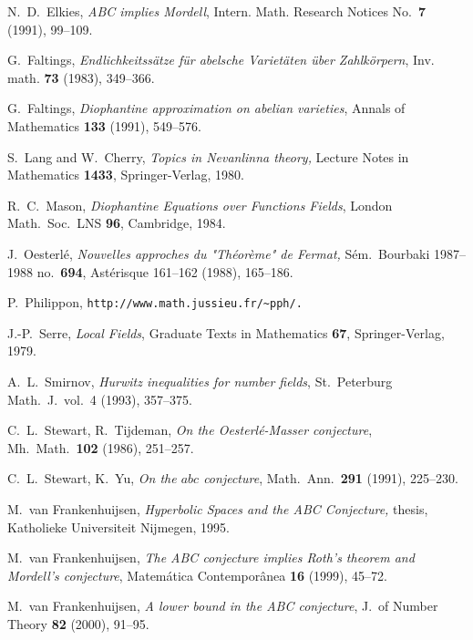 \documentclass{amsart}
\theoremstyle{definition}\newtheorem{definition}[theorem]{Definition}
\theoremstyle{remark}\newtheorem{remark}[theorem]{Remark}
\numberwithin{equation}{section}
\begin{document}

\begin{thebibliography}{M}

	N.\ D.\ Elkies,
\textit{ABC implies Mordell},
Intern. Math. Research Notices No.~\textbf{7} (1991), 99--109.

	G.\ Faltings,
\textit{Endlichkeitss\"atze f\"ur abelsche Variet\"aten \"uber Zahlk\"orpern},
Inv. math. \textbf{73} (1983), 349--366.

	G.\ Faltings,
\textit{Diophantine approximation on abelian varieties},
Annals of Mathematics \textbf{133} (1991), 549--576.

	S.\ Lang and W.\ Cherry,
\textit{Topics in Nevanlinna theory,}
Lecture Notes in Mathematics \textbf{1433}, Springer-Verlag, 1980.

	R.\ C.\ Mason,
\textit{Diophantine Equations over Functions Fields},
London Math.\ Soc.\ LNS \textbf{96}, Cambridge, 1984.

	J.\ Oesterl\'e,
\textit{Nouvelles approches du "Th\'eor\`eme" de Fermat,\/}
S\'em.\ Bourbaki 1987--1988 no.\ \textbf{694}, Ast\'erisque 161--162 (1988), 165--186.

	P.\ Philippon,
\texttt{http://www.math.jussieu.fr/\~{}pph/.}

	J.-P.\ Serre,
\textit{Local Fields},
Graduate Texts in Mathematics \textbf{67}, Springer-Verlag, 1979.

	A.\ L.\ Smirnov,
\textit{Hurwitz inequalities for number fields},
St.\ Peterburg Math.\ J.\ vol.\ 4 (1993), 357--375.

	C.\ L.\ Stewart, R.\ Tijdeman,
\textit{On the Oesterl\'e-Masser conjecture},
Mh.\ Math.\ \textbf{102} (1986), 251--257.

	C.\ L.\ Stewart, K.\ Yu,
\textit{On the $abc$ conjecture},
Math.\ Ann.\ \textbf{291} (1991), 225--230.

	M.\ van Frankenhuijsen,
\textit{Hyperbolic Spaces and the ABC Conjecture,\/}
thesis, Katholieke Universiteit Nijmegen, 1995.

	M.\ van Frankenhuijsen,
\textit{The ABC conjecture implies Roth's theorem and Mordell's conjecture},
Matem\'atica Contempor\^anea \textbf{16} (1999), 45--72.

	M.\ van Frankenhuijsen,
\textit{A lower bound in the ABC conjecture},
J.\ of Number Theory \textbf{82} (2000), 91--95.


\end{thebibliography}
\end{document}
